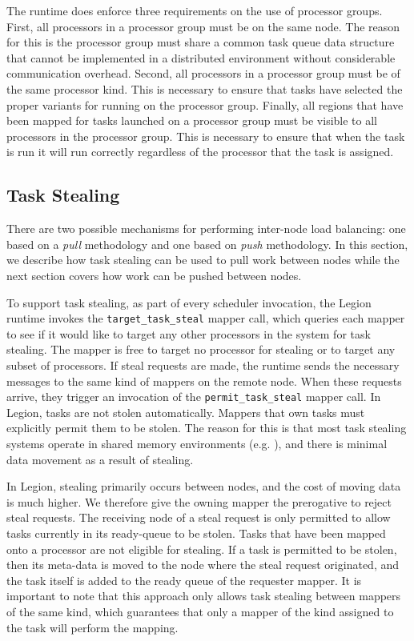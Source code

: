 The runtime does enforce three requirements on the
use of processor groups.  First, all processors
in a processor group must be on the same node.
The reason for this is the processor group must
share a common task queue data structure that 
cannot be implemented in a distributed environment
without considerable communication overhead. Second,
all processors in a processor group must be of the
same processor kind. This is necessary to ensure
that tasks have selected the proper variants for
running on the processor group. Finally, all 
regions that have been mapped for tasks launched
on a processor group must be visible to all 
processors in the processor group. This is 
necessary to ensure that when the task is run
it will run correctly regardless of the processor
that the task is assigned.

\subsection{Task Stealing}
\label{subsec:stealing}
There are two possible mechanisms for performing
inter-node load balancing: one based on a 
{\em pull} methodology and one based on {\em push}
methodology.  In this section, we describe how
task stealing can be used to pull work between 
nodes while the next section covers how work can be
pushed between nodes.

To support task stealing, as part of every scheduler
invocation, the Legion runtime invokes the 
{\tt target\_task\_steal} mapper call, which 
queries each mapper to see if it would like to
target any other processors in the system for
task stealing. The mapper is free to target no
processor for stealing or to target any subset
of processors. If steal requests are made, the 
runtime sends the necessary messages to the 
same kind of mappers on the remote node. When
these requests arrive, they trigger an invocation
of the {\tt permit\_task\_steal} mapper call.
In Legion, tasks are not stolen automatically.
Mappers that own tasks must explicitly permit
them to be stolen. The reason for this is that
most task stealing systems operate in shared
memory environments (e.g. \cite{Cilk98}), and
there is minimal data movement as a result of
stealing.  

In Legion, stealing primarily occurs
between nodes, and the cost of moving data is
much higher.  We therefore give the owning mapper
the prerogative to reject steal requests. The
receiving node of a steal request is only
permitted to allow tasks currently in its
ready-queue to be stolen.  Tasks that have
been mapped onto a processor are not eligible
for stealing. If a task is permitted to be
stolen, then its meta-data is moved to the node
where the steal request originated, and the
task itself is added to the ready queue of
the requester mapper. It is important to note
that this approach only allows task stealing
between mappers of the same kind, which guarantees
that only a mapper of the kind assigned to the
task will perform the mapping.


